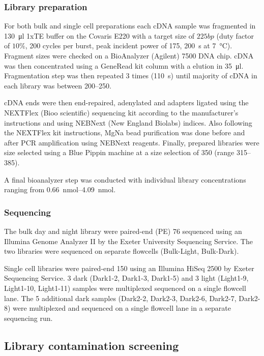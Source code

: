 \subsubsection{Library preparation}

For both bulk and single cell preparations each cDNA sample was fragmented in \SI{130}{\micro\litre}
1xTE buffer on the Covaris E220 
with a target size of \(225bp\) (duty factor of \(10\%\), 200 cycles per burst, peak incident power
of 175, \SI{200}{\second} at \SI{7}{\degreeCelsius}). Fragment sizes were checked on a BioAnalyzer (Agilent) 7500 DNA chip.
cDNA was then concentrated using a GeneRead kit column with a elution in \SI{35}{\micro\litre}. Fragmentation
step was then repeated 3 times (\SI{110}{\second}) until majority of cDNA in each library was between \SIrange{200}{250}{\bp}.

cDNA ends were then end-repaired, adenylated and adapters ligated using the NEXTFlex (Bioo scientific) sequencing kit 
according to the manufacturer's instructions and using NEBNext (New England Biolabs) indices.  Also following
the NEXTFlex kit instructions, MgNa bead purification was done before and after PCR amplification using
NEBNext reagents.  Finally, prepared libraries were size selected using a Blue Pippin machine at a size selection
of \SI{350}{\bp} (range \SIrange{315}{385}{\bp}).

A final bioanalyzer step was conducted with individual library concentrations ranging from \SIrange{0.66}{4.09}{\nano\mole}.


\subsubsection{Sequencing}

The bulk day and night library were paired-end (PE) \SI{76}{\bp} sequenced using an Illumina Genome
Analyzer II by the Exeter University Sequencing Service.  The two libraries were sequenced
on separate flowcells (Bulk-Light, Bulk-Dark).

Single cell libraries were paired-end \SI{150}{\bp} using an Illumina HiSeq 2500 by Exeter
Sequencing Service. 3 dark (Dark1-2, Dark1-3, Dark1-5) and 3 light (Light1-9, Light1-10, Light1-11)
samples were multiplexed sequenced on a single flowcell lane.  The 5 additional 
dark samples (Dark2-2, Dark2-3, Dark2-6, Dark2-7, Dark2-8) were multiplexed and sequenced on a single
flowcell lane in a separate sequencing run.

\subsection{Library contamination screening}

